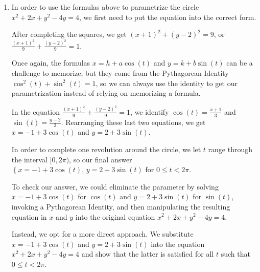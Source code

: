 \documentclass{ximera}
\begin{document}
\begin{example}
\begin{explanation}
\begin{enumerate}
   
  
   To check, we can solve $x = 2-t$ for $t$ to get $t = 2-x$.  Substituting this into $y = -3+8t$ gives $y = -3+8t = -3+8(2-x)$, or $y = -8x+13$.  We know this is the graph of a line, so all we need to check is that it starts and stops at the correct points.  
   
    
   
     When $t=0$, $x= 2-t = 2$, and  when $t=1$, $x = 2-t = 1$.  Plugging in $x=2$ gives $y = -8(2)+13 = -3$, for an initial point of $(2,-3)$.  When  $x = 1$,  $y = -8(1)+13 = 5$ for an ending point of $(1,5)$, as required.

\item In order to use the formulas above to parametrize the circle $x^2 + 2x + y^2 - 4y = 4$, we first need to put the equation into the correct form.  

 

After completing the squares, we get $(x+1)^2+(y-2)^2 = 9$, or $\frac{(x+1)^2}{9} + \frac{(y-2)^2}{9} = 1$.  

 

Once again, the formulas $x = h+a\cos(t)$ and $y=k+b\sin(t)$ can be a challenge to memorize, but they come from the Pythagorean Identity $\cos^{2}(t) + \sin^{2}(t) = 1$, so we can always use the identity to get our parametrization instead of relying on memorizing a formula.

 

In the equation $\frac{(x+1)^2}{9} + \frac{(y-2)^2}{9} = 1$, we identify $\cos(t) = \frac{x+1}{3}$ and $\sin(t) = \frac{y-2}{3}$.  Rearranging these last two equations, we get $x = -1+3 \cos(t)$ and $y = 2 +3 \sin(t)$.  

 

 In order to complete one revolution around the circle, we let $t$ range through the interval $[0,2\pi)$, so   our final answer $\left\{ x = -1+3 \cos(t), \, y = 2 +3 \sin(t) \right.$ for $0 \leq t < 2\pi$.  
 
  
 
 To check our answer, we could eliminate the parameter by solving  $x = -1+3\cos(t)$ for $\cos(t)$ and $y = 2+3\sin(t)$ for $\sin(t)$, invoking a Pythagorean Identity, and then manipulating the resulting equation in $x$ and $y$ into the original equation  $x^2+2x+y^2-4y = 4$.  
 
  
 
 Instead, we opt for a more direct approach.  We substitute $x = -1+3\cos(t)$ and $y = 2+3\sin(t)$ into the equation $x^2 + 2x + y^2 - 4y = 4$ and show that the latter is satisfied for all $t$ such that $0 \leq t < 2\pi$.


\end{enumerate}
\end{explanation}
\end{example}
\end{document}
